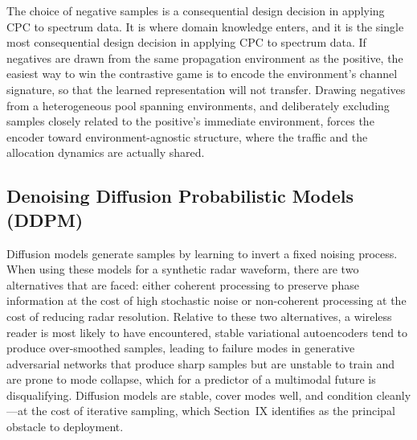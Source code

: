 \documentclass[lettersize,journal]{IEEEtran}
\begin{document}
The choice of negative samples is a consequential design decision in applying
CPC to spectrum data.
It is where domain knowledge enters, and it is the
single most consequential design decision in applying CPC to spectrum
data.
If negatives are drawn from the same propagation environment as
the positive, the easiest way to win the contrastive game is to encode
the environment's channel signature, so that the learned representation will
not transfer.
Drawing negatives from a heterogeneous pool spanning
environments, and deliberately excluding samples closely related to the
positive's immediate environment, forces the encoder toward
environment-agnostic structure, where the traffic and the allocation dynamics
 are actually shared.

\subsection{\textbf{Denoising Diffusion Probabilistic Models (DDPM)}}
Diffusion models \cite{SohlDickstein2015, Ho2020} generate samples 
by learning to invert a fixed noising process.
When using these models for a synthetic radar waveform, 
there are two alternatives that are faced: either coherent processing to 
preserve phase information at the cost of high stochastic noise or
non-coherent processing at the cost of reducing radar resolution.
 Relative to these two alternatives, a wireless reader is most likely to
have encountered, stable variational autoencoders
\cite{Kingma2014} tend to produce over-smoothed samples,
leading to failure modes in generative
adversarial networks \cite{Goodfellow2014} that produce sharp samples but are
unstable to train and are prone to mode collapse, which for a predictor of a
multimodal future is disqualifying.
Diffusion models are stable, cover modes well,
and condition cleanly---at the cost of iterative sampling, which
Section~IX identifies as the principal obstacle to deployment.

\end{document}
